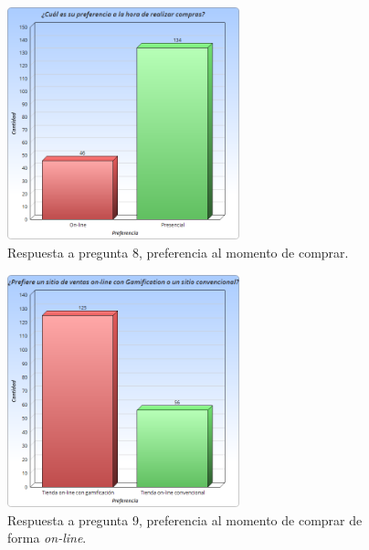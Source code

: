 \begin{figure}[!htb]
  \centering
  \includegraphics[width=0.6\textwidth]{images/Graficos/graf_5_9.png}
  \caption[Gráfico pregunta 8, preferencia al momento de comprar.]{Respuesta a pregunta 8, preferencia al momento de comprar.}
  \label{fig:chart5.9}
\end{figure}

\begin{figure}[!htb]
  \centering
  \includegraphics[width=0.6\textwidth]{images/Graficos/graf_5_10.png}
  \caption[Gráfico pregunta 9, preferencia al momento de comprar de forma \emph{on-line}.]{Respuesta a pregunta 9, preferencia al momento de comprar de forma \emph{on-line}.}
  \label{fig:chart5.10}
\end{figure}


